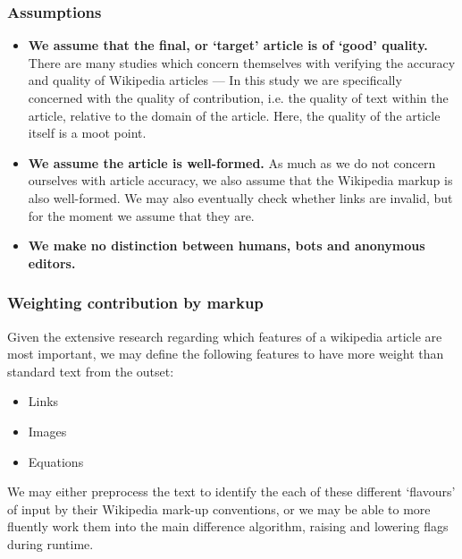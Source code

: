 \documentclass[a4paper,11pt,twoside,notitlepage]{article}
\begin{document}
        \subsubsection*{Assumptions}
        \begin{itemize}
          \item \textbf{We assume that the final, or `target' article
            is of `good' quality.} There are many studies which concern
            themselves with verifying the accuracy and quality of
            Wikipedia articles --- In this study we are specifically
            concerned with the quality of contribution, i.e. the
            quality of text within the article, relative to the domain
            of the article. Here, the quality of the article itself is a
            moot point.
          \item \textbf{We assume the article is well-formed.} As much
            as we do not concern ourselves with article accuracy, we
            also assume that the Wikipedia markup is also
            well-formed. We may also eventually check whether links
            are invalid, but for the moment we assume that they are.
          \item \textbf{We make no distinction between humans, bots
            and anonymous editors.}
        \end{itemize}
        
        \subsubsection*{Weighting contribution by markup}
        Given the extensive research regarding which features of a
        wikipedia article are most important, we may define the
        following features to have more weight than standard text from
        the outset:
        \begin{itemize}
          \item Links
          \item Images
          \item Equations
        \end{itemize}

        We may either preprocess the text to identify the each of
        these different `flavours' of input by their Wikipedia mark-up
        conventions, or we may be able to more fluently work them into
        the main difference algorithm, raising and lowering flags
        during runtime.
\end{document}
